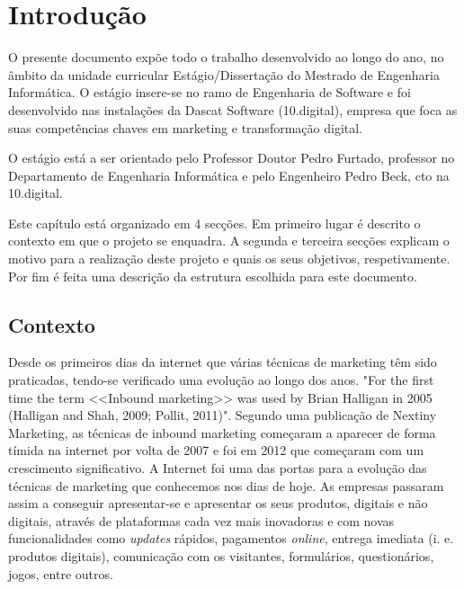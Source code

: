 \chapter{Introdução}
\label{sec:introducao}

O presente documento expõe todo o trabalho desenvolvido ao longo do ano, no âmbito da unidade curricular Estágio/Dissertação do Mestrado de Engenharia Informática. O estágio insere-se no ramo de Engenharia de Software e foi desenvolvido nas instalações da Dascat Software (10.digital)\cite{10}, empresa que foca as suas competências chaves em marketing e transformação digital. 

O estágio está a ser orientado pelo Professor Doutor Pedro Furtado, professor no Departamento de Engenharia Informática e pelo Engenheiro Pedro Beck, \acrshort{cto} na 10.digital.

Este capítulo está organizado em 4 secções. Em primeiro lugar é descrito o contexto em que o projeto se enquadra. A segunda e terceira secções explicam o motivo para a realização deste projeto e quais os seus objetivos, respetivamente. Por fim é feita uma descrição da estrutura escolhida para este documento.

\section{Contexto}
\label{subsec:contexto}

Desde os primeiros dias da internet que várias técnicas de marketing têm sido praticadas, tendo-se verificado uma evolução ao longo dos anos. "For the first time the term <<Inbound marketing>> was used by Brian Halligan in 2005 (Halligan and Shah, 2009; Pollit, 2011)"\cite{bookinbound}\cite{inbound_paper}. Segundo uma publicação de Nextiny Marketing\cite{postNextiny}, as técnicas de inbound marketing começaram a aparecer de forma tímida na internet por volta de 2007 e foi em 2012 que começaram com um crescimento significativo. A Internet foi uma das portas para a evolução das técnicas de marketing que conhecemos nos dias de hoje. As empresas passaram assim a conseguir apresentar-se e apresentar os seus produtos, digitais e não digitais, através de plataformas cada vez mais inovadoras e com novas funcionalidades como \textit{updates} rápidos, pagamentos \textit{online}, entrega imediata (i. e. produtos digitais), comunicação com os visitantes, formulários, questionários, jogos, entre outros.  

